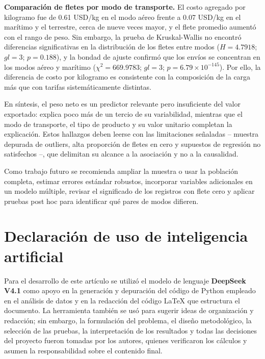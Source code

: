 \documentclass[12pt]{article}
\begin{document}
\textbf{Comparación de fletes por modo de transporte.} El costo
agregado por kilogramo fue de 0.61 USD/kg en el modo aéreo frente a
0.07 USD/kg en el marítimo y el terrestre, cerca de nueve veces mayor,
y el flete promedio aumentó con el rango de peso. Sin embargo, la
prueba de Kruskal-Wallis no encontró diferencias significativas en la
distribución de los fletes entre modos (\(H = 4.7918\); \(gl = 3\);
\(p = 0.188\)), y la bondad de ajuste confirmó que los envíos se
concentran en los modos aéreo y marítimo
(\(\chi^2 = 669.9783\); \(gl = 3\); \(p = 6.79 \times 10^{-145}\)).
Por ello, la diferencia de costo por kilogramo es consistente con la
composición de la carga más que con tarifas sistemáticamente distintas.

En síntesis, el peso neto es un predictor relevante pero insuficiente
del valor exportado: explica poco más de un tercio de su variabilidad,
mientras que el modo de transporte, el tipo de producto y su valor
unitario completan la explicación. Estos hallazgos deben leerse con las
limitaciones señaladas -- muestra depurada de outliers, alta proporción
de fletes en cero y supuestos de regresión no satisfechos --, que
delimitan su alcance a la asociación y no a la causalidad.

Como trabajo futuro se recomienda ampliar la muestra o usar la
población completa, estimar errores estándar robustos, incorporar
variables adicionales en un modelo múltiple, revisar el significado de
los registros con flete cero y aplicar pruebas post hoc para
identificar qué pares de modos difieren.

\newpage

\section*{Declaración de uso de inteligencia artificial}

Para el desarrollo de este artículo se utilizó el modelo de lenguaje
\textbf{DeepSeek V4.1} como apoyo en la generación y depuración del
código de Python empleado en el análisis de datos y en la redacción del
código LaTeX que estructura el documento. La herramienta también se usó
para sugerir ideas de organización y redacción; sin embargo, la
formulación del problema, el diseño metodológico, la selección de las
pruebas, la interpretación de los resultados y todas las decisiones del
proyecto fueron tomadas por los autores, quienes verificaron los
cálculos y asumen la responsabilidad sobre el contenido final.
\end{document}
